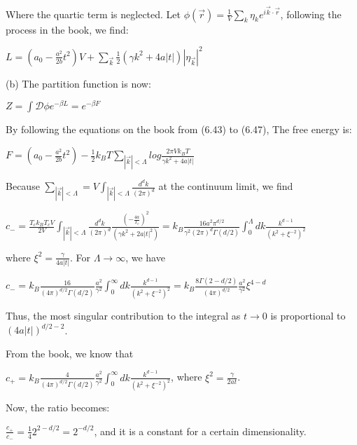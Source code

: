\documentclass[12pt,titlepage]{article}
\numberwithin{equation}{section}
\begin{document}
Where the quartic term is neglected. Let $\displaystyle \phi \left(\vec{r}\right) =\frac{1}{V}\sum _{k} \eta _{k} e^{i\vec{k} \cdot \vec{r}}$, following the process in the book, we find:

$\displaystyle L=\left( a_{0} -\frac{a^{2}}{2b} t^{2}\right) V+\sum _{\vec{k}}\frac{1}{2}\left( \gamma k^{2} +4a|t|\right) |\eta _{\vec{k}} |^{2}$



(b) The partition function is now:

$\displaystyle Z=\int \mathcal{D} \phi e^{-\beta L} =e^{-\beta F}$

By following the equations on the book from (6.43) to (6.47), The free energy is:

$\displaystyle F=\left( a_{0} -\frac{a^{2}}{2b} t^{2}\right) -\frac{1}{2} k_{B} T\sum _{|\vec{k} |< \Lambda } log\frac{2\pi Vk_{B} T}{\gamma k^{2} +4a|t|}$

Because $\displaystyle \sum _{|\vec{k} |< \Lambda } =V\int _{|\vec{k} |< \Lambda }\frac{d^{d} k}{( 2\pi )^{d}}$ at the continuum limit, we find

$\displaystyle c_{-} =\frac{T_{c} k_{B} T_{c} V}{2V}\int _{|\vec{k} |< \Lambda }\frac{d^{d} k}{( 2\pi )^{d}}\frac{\left( -\frac{4a}{T_{c}}\right)^{2}}{\left( \gamma k^{2} +2a|t|^{2}\right)} =k_{B}\frac{16a^{2} \pi ^{d/2}}{\gamma ^{2}( 2\pi )^{d} \Gamma ( d/2)}\int ^{\Lambda }_{0} dk\frac{k^{d-1}}{\left( k^{2} +\xi ^{-2}\right)^{2}}$

where $\displaystyle \xi ^{2} =\frac{\gamma }{4a|t|}$. For $\displaystyle \Lambda \rightarrow \infty $, we have

$\displaystyle c_{-} =k_{B}\frac{16}{( 4\pi )^{d/2} \Gamma ( d/2)}\frac{a^{2}}{\gamma ^{2}}\int ^{\infty }_{0} dk\frac{k^{d-1}}{\left( k^{2} +\xi ^{-2}\right)^{2}} =k_{B}\frac{8\Gamma ( 2-d/2)}{( 4\pi )^{d/2}}\frac{a^{2}}{\gamma ^{2}} \xi ^{4-d}$

Thus, the most singular contribution to the integral as $t\rightarrow 0$ is proportional to $(4a|t|)^{d/2-2}$. 

From the book, we know that 

$\displaystyle c_{+} =k_{B}\frac{4}{( 4\pi )^{d/2} \Gamma ( d/2)}\frac{a^{2}}{\gamma ^{2}}\int ^{\infty }_{0} dk\frac{k^{d-1}}{\left( k^{2} +\xi ^{-2}\right)^{2}}$, where $\displaystyle \xi ^{2} =\frac{\gamma }{2at}$.

Now, the ratio becomes:

$\displaystyle \frac{c_{+}}{c_{-}} =\frac{1}{4} 2^{2-d/2} =2^{-d/2}$, and it is a constant for a certain dimensionality.
\end{document}
